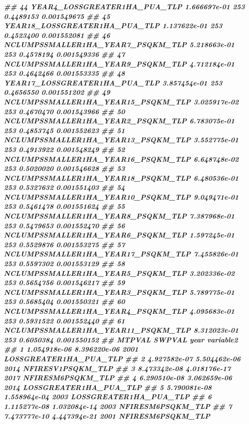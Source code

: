 \documentclass[10pt,landscape,a3paper]{article}
\newenvironment{Shaded}{\begin{snugshade}}{\end{snugshade}}
\newcommand{\DocumentationTok}[1]{\textcolor[rgb]{0.56,0.35,0.01}{\textbf{\textit{#1}}}}
\begin{document}
\begin{Shaded}
\begin{Highlighting}[]
\DocumentationTok{\#\# 44       YEAR4\_LOSSGREATER1HA\_PUA\_TLP 1.666697e{-}01    253 0.4489153 0.001549675}
\DocumentationTok{\#\# 45      YEAR18\_LOSSGREATER1HA\_PUA\_TLP 1.137622e{-}01    253 0.4523400 0.001552081}
\DocumentationTok{\#\# 46  NCLUMPSSMALLER1HA\_YEAR7\_PSQKM\_TLP 5.218663e{-}01    253 0.4578194 0.001549336}
\DocumentationTok{\#\# 47  NCLUMPSSMALLER1HA\_YEAR9\_PSQKM\_TLP 4.712184e{-}01    253 0.4642466 0.001553335}
\DocumentationTok{\#\# 48      YEAR17\_LOSSGREATER1HA\_PUA\_TLP 3.857454e{-}01    253 0.4656550 0.001551202}
\DocumentationTok{\#\# 49 NCLUMPSSMALLER1HA\_YEAR15\_PSQKM\_TLP 3.025917e{-}02    253 0.4670470 0.001543966}
\DocumentationTok{\#\# 50  NCLUMPSSMALLER1HA\_YEAR2\_PSQKM\_TLP 6.783075e{-}01    253 0.4853745 0.001552623}
\DocumentationTok{\#\# 51 NCLUMPSSMALLER1HA\_YEAR13\_PSQKM\_TLP 3.552775e{-}01    253 0.4913922 0.001548249}
\DocumentationTok{\#\# 52 NCLUMPSSMALLER1HA\_YEAR16\_PSQKM\_TLP 6.648748e{-}02    253 0.5020020 0.001546628}
\DocumentationTok{\#\# 53 NCLUMPSSMALLER1HA\_YEAR18\_PSQKM\_TLP 6.480536e{-}01    253 0.5327632 0.001551403}
\DocumentationTok{\#\# 54 NCLUMPSSMALLER1HA\_YEAR10\_PSQKM\_TLP 9.049471e{-}01    253 0.5461478 0.001551624}
\DocumentationTok{\#\# 55  NCLUMPSSMALLER1HA\_YEAR8\_PSQKM\_TLP 7.387968e{-}01    253 0.5479653 0.001552470}
\DocumentationTok{\#\# 56  NCLUMPSSMALLER1HA\_YEAR6\_PSQKM\_TLP 1.597245e{-}01    253 0.5529876 0.001553275}
\DocumentationTok{\#\# 57 NCLUMPSSMALLER1HA\_YEAR17\_PSQKM\_TLP 7.455826e{-}01    253 0.5597302 0.001553129}
\DocumentationTok{\#\# 58  NCLUMPSSMALLER1HA\_YEAR5\_PSQKM\_TLP 3.202336e{-}02    253 0.5654756 0.001546217}
\DocumentationTok{\#\# 59  NCLUMPSSMALLER1HA\_YEAR3\_PSQKM\_TLP 5.789775e{-}01    253 0.5685404 0.001550321}
\DocumentationTok{\#\# 60  NCLUMPSSMALLER1HA\_YEAR4\_PSQKM\_TLP 4.095683e{-}01    253 0.5931522 0.001552440}
\DocumentationTok{\#\# 61 NCLUMPSSMALLER1HA\_YEAR11\_PSQKM\_TLP 8.312023e{-}01    253 0.6050384 0.001550152}
\DocumentationTok{\#\#          MTPVAL       SWPVAL year                  variable2}
\DocumentationTok{\#\# 1  1.054918e{-}06 8.396220e{-}06 2001     LOSSGREATER1HA\_PUA\_TLP}
\DocumentationTok{\#\# 2  4.927582e{-}07 5.504462e{-}06 2014          NFIRESV1PSQKM\_TLP}
\DocumentationTok{\#\# 3  8.473342e{-}08 4.018176e{-}17 2017          NFIRESM6PSQKM\_TLP}
\DocumentationTok{\#\# 4  6.290510e{-}08 3.062659e{-}06 2014     LOSSGREATER1HA\_PUA\_TLP}
\DocumentationTok{\#\# 5  5.790081e{-}08 1.558964e{-}04 2003     LOSSGREATER1HA\_PUA\_TLP}
\DocumentationTok{\#\# 6  1.115277e{-}08 1.032084e{-}14 2003          NFIRESM6PSQKM\_TLP}
\DocumentationTok{\#\# 7  7.473777e{-}10 4.447394e{-}21 2001          NFIRESM6PSQKM\_TLP}

\end{Highlighting}
\end{Shaded}
\end{document}
